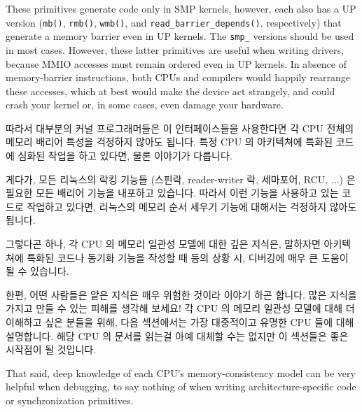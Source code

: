 These primitives generate code only in SMP kernels, however, each
also has a UP version ({\tt mb()}, {\tt rmb()}, {\tt wmb()},
and {\tt read\_barrier\_depends()},
respectively) that generate a memory barrier even in UP kernels. The {\tt smp\_}
versions should be used in most cases. However, these latter primitives
are useful when writing drivers, because MMIO accesses must remain
ordered even in UP kernels. In absence of memory-barrier instructions,
both CPUs and compilers would happily rearrange these accesses, which at
best would make the device act strangely, and could crash your kernel or,
in some cases, even damage your hardware.
\fi

따라서 대부분의 커널 프로그래머들은 이 인터페이스들을 사용한다면 각 CPU 전체의
메모리 배리어 특성을 걱정하지 않아도 됩니다.
특정 CPU 의 아키텍쳐에 특화된 코드에 심화된 작업을 하고 있다면, 물론 이야기가
다릅니다.

게다가, 모든 리눅스의 락킹 기능들 (스핀락, reader-writer 락, 세마포어, RCU,
...) 은 필요한 모든 배리어 기능을 내포하고 있습니다.
따라서 이런 기능을 사용하고 있는 코드로 작업하고 있다면, 리눅스의 메모리 순서
세우기 기능에 대해서는 걱정하지 않아도 됩니다.

그렇다곤 하나, 각 CPU 의 메모리 일관성 모델에 대한 깊은 지식은, 말하자면
아키텍쳐에 특화된 코드나 동기화 기능을 작성할 때 등의 상황 시, 디버깅에 매우 큰
도움이 될 수 있습니다.

한편, 어떤 사람들은 얕은 지식은 매우 위험한 것이라 이야기 하곤 합니다.
많은 지식을 가지고 만들 수 있는 피해를 생각해 보세요!
각 CPU 의 메모리 일관성 모델에 대해 더 이해하고 싶은 분들을 위해, 다음
섹션에서는 가장 대중적이고 유명한 CPU 들에 대해 설명합니다.
해당 CPU 의 문서를 읽는걸 아예 대체할 수는 없지만 이 섹션들은 좋은 시작점이 될
것입니다.
\iffalse

That said, deep knowledge of each CPU's memory-consistency model
can be very helpful when debugging, to say nothing of when writing
architecture-specific code or synchronization primitives.

